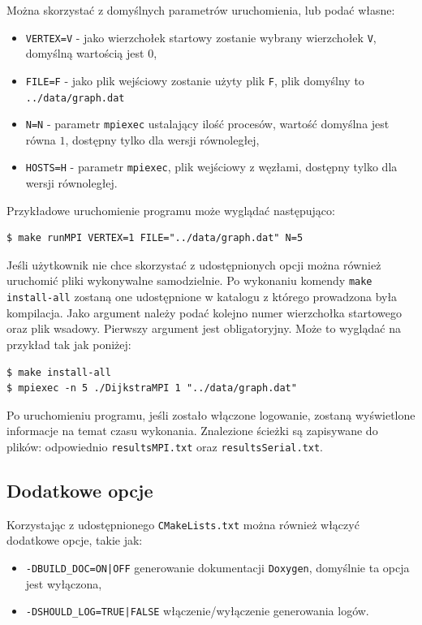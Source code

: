 \documentclass[12pt]{article}
\begin{document}
\noindent
Można skorzystać z domyślnych parametrów uruchomienia, lub podać własne:
\begin{itemize}
\item  \lstinline|VERTEX=V| - jako wierzchołek startowy zostanie wybrany wierzchołek \lstinline|V|, domyślną wartością jest $0$,
\item  \lstinline|FILE=F| - jako plik wejściowy zostanie użyty plik \lstinline|F|, plik domyślny to \lstinline{../data/graph.dat}
\item  \lstinline|N=N| - parametr \lstinline|mpiexec| ustalający ilość procesów, wartość domyślna jest równa $1$, dostępny tylko dla wersji równoległej,
\item  \lstinline|HOSTS=H| -  parametr \lstinline|mpiexec|, plik wejściowy z węzłami, dostępny tylko dla wersji równoległej.
\end{itemize}

\noindent
Przykładowe uruchomienie programu może wyglądać następująco:
\begin{lstlisting}
$ make runMPI VERTEX=1 FILE="../data/graph.dat" N=5
\end{lstlisting}

Jeśli użytkownik nie chce skorzystać z udostępnionych opcji można również uruchomić pliki wykonywalne samodzielnie. Po wykonaniu komendy \lstinline|make install-all| zostaną one udostępnione w katalogu z którego prowadzona była kompilacja. Jako argument należy podać kolejno numer wierzchołka startowego oraz plik wsadowy. Pierwszy argument jest obligatoryjny. Może to wyglądać na przykład tak jak poniżej:

\begin{lstlisting}
$ make install-all
$ mpiexec -n 5 ./DijkstraMPI 1 "../data/graph.dat"
\end{lstlisting}

Po uruchomieniu programu, jeśli zostało włączone logowanie, zostaną wyświetlone informacje na temat czasu wykonania. Znalezione ścieżki są zapisywane do plików: odpowiednio \lstinline|resultsMPI.txt| oraz \lstinline|resultsSerial.txt|.

\subsection{Dodatkowe opcje}
Korzystając z udostępnionego \lstinline|CMakeLists.txt| można również włączyć dodatkowe opcje, takie jak:
\begin{itemize}
\item \lstinline+-DBUILD_DOC=ON|OFF+ generowanie dokumentacji \lstinline|Doxygen|, domyślnie ta opcja jest wyłączona,
\item \lstinline+-DSHOULD_LOG=TRUE|FALSE+ włączenie/wyłączenie generowania logów.
\end{itemize}
\end{document}
